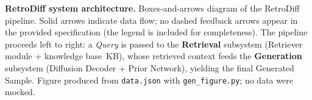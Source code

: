 \caption{\textbf{RetroDiff system architecture.}
Boxes-and-arrows diagram of the RetroDiff pipeline.
Solid arrows indicate data flow; no dashed feedback arrows appear in the
provided specification (the legend is included for completeness).
The pipeline proceeds left to right: a \textit{Query} is passed to the
\textbf{Retrieval} subsystem (Retriever module + knowledge base~KB), whose
retrieved context feeds the \textbf{Generation} subsystem (Diffusion
Decoder + Prior Network), yielding the final Generated Sample.
Figure produced from \texttt{data.json} with \texttt{gen\_figure.py};
no data were mocked.}
